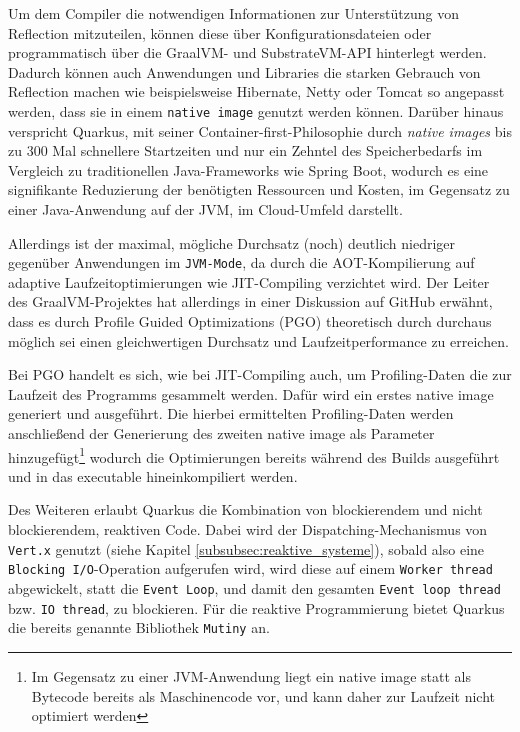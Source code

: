 Um dem Compiler die notwendigen Informationen zur Unterstützung von Reflection mitzuteilen, können
diese über Konfigurationsdateien oder programmatisch über die GraalVM- und SubstrateVM-API hinterlegt werden.
Dadurch können auch Anwendungen und Libraries die starken Gebrauch von Reflection machen wie beispielsweise Hibernate, Netty oder Tomcat
so angepasst werden, dass sie in einem \verb|native image| genutzt werden können.
\parencite{GraalVMNativeImage}
Darüber hinaus verspricht Quarkus, mit seiner Container-first-Philosophie durch \textit{native images} bis zu 300 Mal schnellere Startzeiten
und nur ein Zehntel des Speicherbedarfs im Vergleich zu traditionellen Java-Frameworks wie Spring Boot, wodurch es eine signifikante Reduzierung
der benötigten Ressourcen und Kosten, im Gegensatz zu einer Java-Anwendung auf der JVM, im Cloud-Umfeld darstellt.
\parencite{RedHatQuarkusInfografik}

Allerdings ist der maximal, mögliche Durchsatz (noch) deutlich niedriger gegenüber Anwendungen im \verb|JVM-Mode|, da durch die AOT-Kompilierung
auf adaptive Laufzeitoptimierungen wie JIT-Compiling verzichtet wird.
Der Leiter des GraalVM-Projektes hat allerdings in einer Diskussion auf GitHub erwähnt, dass es durch Profile Guided Optimizations (PGO)
theoretisch durch durchaus möglich sei einen gleichwertigen Durchsatz und Laufzeitperformance zu erreichen\parencite{GraalWuerthinger}.

Bei PGO handelt es sich, wie bei JIT-Compiling auch, um Profiling-Daten die zur Laufzeit des Programms gesammelt werden.
Dafür wird ein erstes native image generiert und ausgeführt. Die hierbei ermittelten Profiling-Daten werden anschließend der
Generierung des zweiten native image als Parameter hinzugefügt\footnote{Im Gegensatz zu einer JVM-Anwendung liegt ein
  native image statt als Bytecode bereits als Maschinencode vor, und kann daher zur Laufzeit nicht optimiert werden}
wodurch die Optimierungen bereits während des Builds ausgeführt und in das executable hineinkompiliert werden.

Des Weiteren erlaubt Quarkus die Kombination von blockierendem und nicht blockierendem, reaktiven Code.
Dabei wird der Dispatching-Mechanismus von \verb|Vert.x| genutzt (siehe Kapitel \ref{subsubsec:reaktive_systeme}), sobald also eine
\verb|Blocking I/O|-Operation aufgerufen wird, wird diese auf einem \verb|Worker thread| abgewickelt, statt die \verb|Event Loop|, und damit den
gesamten \verb|Event loop thread| bzw. \verb|IO thread|, zu blockieren.
Für die reaktive Programmierung bietet Quarkus die bereits genannte Bibliothek \verb|Mutiny| an.\parencite{Quarkus}

